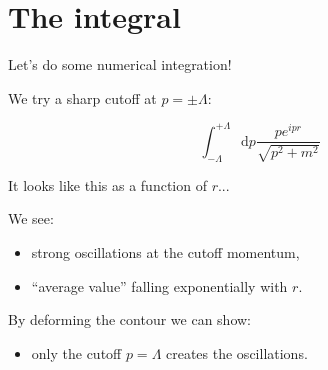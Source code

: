 \documentclass[aspectratio=169]{beamer}
\newcommand{\integrand}{\frac{p e^{ipr}}{\sqrt{p^2 + m^2}}}
\newcommand{\diffop}{\mathop{}\!\mathrm{d}}
\newcommand{\dip}{\diffop p}
\begin{document}


\section{The integral}

\begin{frame}
Let's do some numerical integration!
\end{frame}


\begin{frame}
We try a sharp \alert{cutoff} at $p = \pm \Lambda$:

\pause
$$\int_{-\Lambda}^{+\Lambda} \dip \integrand$$

\pause
\bigskip
It looks like this \alert{as a function of $r$}...
\end{frame}





\begin{frame}
We see:

\begin{itemize}
\pause
\item strong \alert{oscillations} at the cutoff momentum,

\pause
\item \alert{``average value''} falling \alert{exponentially} with $r$.
\end{itemize}

\pause
\bigskip
By deforming the contour we can show:

\pause
\begin{itemize}
\item \alert{only} the cutoff $p = \Lambda$ creates the oscillations.
\end{itemize}
\end{frame}
\end{document}
